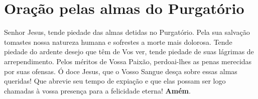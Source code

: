\section*{Oração pelas almas do Purgatório}
Senhor Jesus, tende piedade das almas detidas no Purgatório. Pela sua salvação tomastes nossa natureza humana e sofrestes a morte mais dolorosa. Tende piedade do ardente desejo que têm de Vos ver, tende piedade de suas lágrimas de arrependimento. Pelos méritos de Vossa Paixão, perdoai-lhes as penas merecidas por suas ofensas. Ó doce Jesus, que o Vosso Sangue desça sobre essas almas queridas! Que abrevie seu tempo de expiação e que elas possam ser logo chamadas à vossa presença para a felicidade eterna! \textbf{Amém}.

